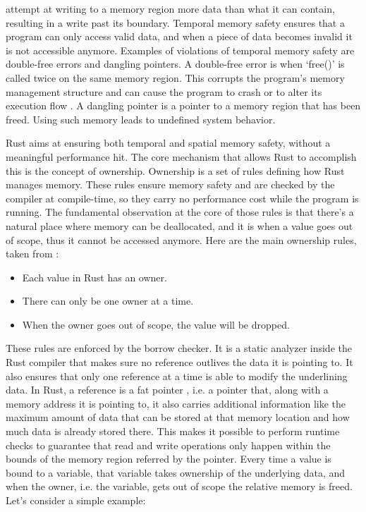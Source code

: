 \documentclass{report}
\begin{document}
attempt at writing to a memory region more data than what it can contain, resulting in a write past its boundary. Temporal memory safety ensures that a program
can only access valid data, and when a piece of data becomes invalid it is not accessible anymore. Examples of violations of temporal memory safety are double-free errors and
dangling pointers. A double-free error is when \enquote*{free()} is called twice on the same memory region. This corrupts the program's memory management structure and can cause
the program to crash or to alter its execution flow \cite{double-free}. A dangling pointer is a pointer to a memory region that has been freed. Using such memory leads to undefined
system behavior. \par

Rust aims at ensuring both temporal and spatial memory safety, without a meaningful performance hit. The core mechanism that allows Rust to accomplish this is the concept of
ownership. Ownership is a set of rules defining how Rust manages memory. These rules ensure memory safety and are checked by the compiler at compile-time, so they carry no
performance cost while the program is running. The fundamental observation at the core of those rules is that there's a natural place where memory can be deallocated, and it is when
a value goes out of scope, thus it cannot be accessed anymore. Here are the main ownership rules, taken from \cite{rust_ownership_rules}:

		\begin{itemize}
				\item Each value in Rust has an owner.
				\item There can only be one owner at a time.
				\item When the owner goes out of scope, the value will be dropped.
		\end{itemize}

These rules are enforced by the borrow checker. It is a static analyzer inside the Rust compiler that makes sure no reference outlives the data it is pointing to. It also ensures
that only one reference at a time is able to modify the underlining data. In Rust, a reference is a fat pointer \cite{eternal-war-in-memory}, i.e. a pointer that, along with a memory address it
is pointing to, it also carries additional information like the maximum amount of data that can be stored at that memory location and how much data is already stored there. This
makes it possible to perform runtime checks to guarantee that read and write operations only happen within the bounds of the memory region referred by the pointer. 
Every time a value is bound to a variable, that variable takes ownership of the underlying data, and when the owner, i.e. the variable, gets out of scope the relative memory is
freed. Let's consider a simple example:
\end{document}
